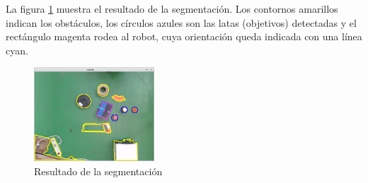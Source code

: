 La figura \ref{fig:segmentation} muestra el resultado de la segmentación. Los contornos amarillos indican los obstáculos, los círculos azules son las latas (objetivos) detectadas y el rectángulo magenta rodea al robot, cuya orientación queda indicada con una línea cyan.\\

\begin{figure}[H]
        \centering
        \includegraphics[width=0.4\textwidth]{images/segmentation.png}
        \caption{Resultado de la segmentación}
        \label{fig:segmentation}
\end{figure} 